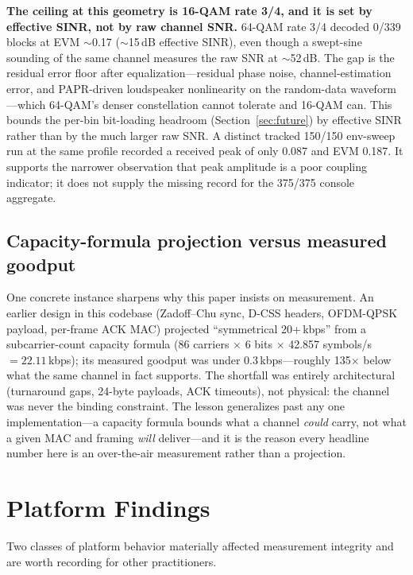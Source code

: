 \documentclass[11pt]{article}
\begin{document}
\textbf{The ceiling at this geometry is 16-QAM rate 3/4, and it is set by
effective SINR, not by raw channel SNR.} 64-QAM rate 3/4 decoded 0/339 blocks at
EVM $\sim$0.17 ($\sim$15\,dB effective SINR), even though a swept-sine sounding
of the same channel measures the raw SNR at $\sim$52\,dB. The gap is the residual
error floor after equalization---residual phase noise, channel-estimation error,
and PAPR-driven loudspeaker nonlinearity on the random-data waveform---which
64-QAM's denser constellation cannot tolerate and 16-QAM can. This bounds the
per-bin bit-loading headroom (Section~\ref{sec:future}) by effective SINR rather
than by the much larger raw SNR. A distinct tracked 150/150 env-sweep run at the
same profile recorded a received peak of only 0.087 and EVM 0.187. It supports
the narrower observation that peak amplitude is a poor coupling indicator; it
does not supply the missing record for the 375/375 console aggregate.

\subsection{Capacity-formula projection versus measured goodput}

One concrete instance sharpens why this paper insists on measurement. An earlier
design in this codebase (Zadoff--Chu sync, D-CSS headers, OFDM-QPSK payload,
per-frame ACK MAC) projected ``symmetrical 20+\,kbps'' from a subcarrier-count
capacity formula ($86$ carriers $\times$ 6 bits $\times$ 42.857 symbols/s
$=22.11$\,kbps); its measured goodput was under 0.3\,kbps---roughly 135$\times$
below what the same channel in fact supports. The shortfall was entirely
architectural (turnaround gaps, 24-byte payloads, ACK timeouts), not physical:
the channel was never the binding constraint. The lesson generalizes past any one
implementation---a capacity formula bounds what a channel \emph{could} carry, not
what a given MAC and framing \emph{will} deliver---and it is the reason every
headline number here is an over-the-air measurement rather than a projection.

\section{Platform Findings}
\label{sec:platform}

Two classes of platform behavior materially affected measurement integrity
and are worth recording for other practitioners.
\end{document}
